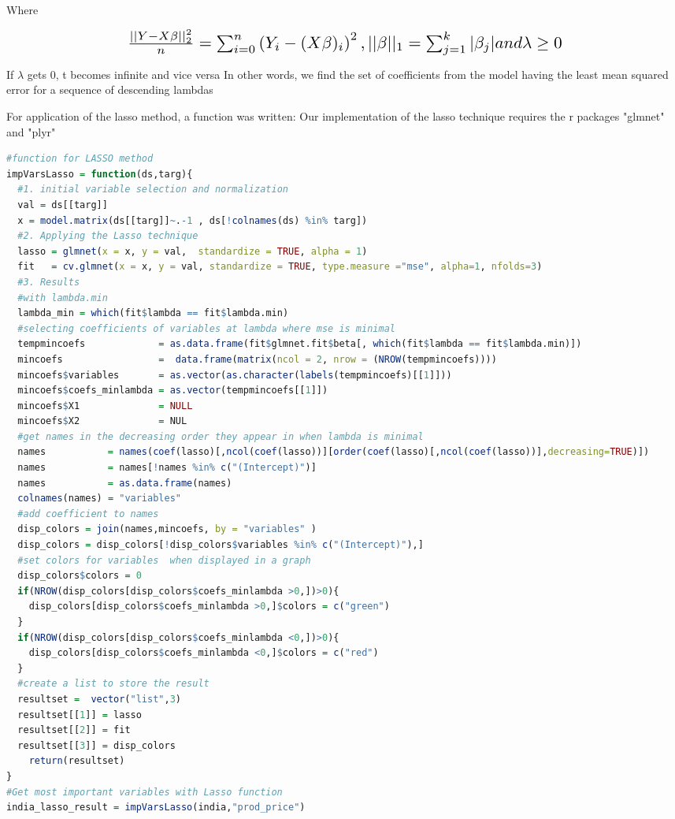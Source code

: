 \documentclass[11pt]{article}
\begin{document}
Where
\begin{center} \[ \scalebox{1.5} {$\frac{||Y-X\beta||_{2}^2}{n} = \sum _{i=0}^n\left ( Y_{i}-(X\beta)_{i} \right )^2, ||\beta||_{1}=\sum _{j=1}^k|\beta_{j}| and \lambda \geq 0 $}\]\end{center} 

If $\lambda$ gets 0, t becomes infinite and vice versa
In other words, we find the set of coefficients from the model having the least mean squared error for  a sequence of descending lambdas

For application of the lasso method, a function was written:
Our implementation of the lasso technique requires the r packages "glmnet" and "plyr"

\begin{lstlisting}[language= R, captionpos=b,caption=\href{https://github.com/jaidikam/sps_ws1718/tree/master/Qfolder4}{SPL\_Q4\_india\_impvar\_lasso}]
#function for LASSO method   
impVarsLasso = function(ds,targ){
  #1. initial variable selection and normalization
  val = ds[[targ]]
  x = model.matrix(ds[[targ]]~.-1 , ds[!colnames(ds) %in% targ])
  #2. Applying the Lasso technique
  lasso = glmnet(x = x, y = val,  standardize = TRUE, alpha = 1)
  fit   = cv.glmnet(x = x, y = val, standardize = TRUE, type.measure ="mse", alpha=1, nfolds=3) 
  #3. Results
  #with lambda.min
  lambda_min = which(fit$lambda == fit$lambda.min) 
  #selecting coefficients of variables at lambda where mse is minimal
  tempmincoefs             = as.data.frame(fit$glmnet.fit$beta[, which(fit$lambda == fit$lambda.min)])
  mincoefs                 =  data.frame(matrix(ncol = 2, nrow = (NROW(tempmincoefs))))
  mincoefs$variables       = as.vector(as.character(labels(tempmincoefs)[[1]]))
  mincoefs$coefs_minlambda = as.vector(tempmincoefs[[1]])
  mincoefs$X1              = NULL
  mincoefs$X2              = NUL 
  #get names in the decreasing order they appear in when lambda is minimal
  names           = names(coef(lasso)[,ncol(coef(lasso))][order(coef(lasso)[,ncol(coef(lasso))],decreasing=TRUE)])
  names           = names[!names %in% c("(Intercept)")]
  names           = as.data.frame(names)
  colnames(names) = "variables" 
  #add coefficient to names
  disp_colors = join(names,mincoefs, by = "variables" )
  disp_colors = disp_colors[!disp_colors$variables %in% c("(Intercept)"),] 
  #set colors for variables  when displayed in a graph
  disp_colors$colors = 0
  if(NROW(disp_colors[disp_colors$coefs_minlambda >0,])>0){
    disp_colors[disp_colors$coefs_minlambda >0,]$colors = c("green")
  }
  if(NROW(disp_colors[disp_colors$coefs_minlambda <0,])>0){
    disp_colors[disp_colors$coefs_minlambda <0,]$colors = c("red")
  }  
  #create a list to store the result
  resultset =  vector("list",3)
  resultset[[1]] = lasso
  resultset[[2]] = fit
  resultset[[3]] = disp_colors
    return(resultset)
}
#Get most important variables with Lasso function
india_lasso_result = impVarsLasso(india,"prod_price")
\end{lstlisting}
\end{document}
